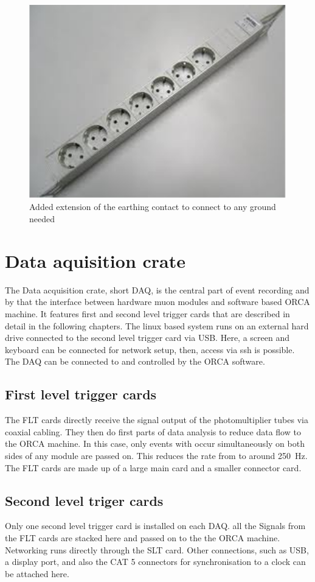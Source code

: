   \begin{figure}
  \centering
  \label{fig:multiplug}
  	\includegraphics[width = 0.4 \textwidth]{graphics/setup/multiplug.pdf}
  	\caption{Added extension of the earthing contact to connect to any ground needed}
  	
  \end{figure}



\section{Data aquisition crate}
\label{ch:DAQ}
The Data acquisition crate, short DAQ, is the central part of event recording and by that the interface between hardware muon modules and software based ORCA machine. It features first and second level trigger cards that are described in detail in the following chapters. The linux based system runs on an external hard drive connected to the second level trigger card via USB. Here, a screen and keyboard can be connected for network setup, then, access via ssh is possible. The DAQ can be connected to and controlled by the ORCA software.
  \subsection{First level trigger cards}
  \label{ch:DAQ:sec:FLTs}
  The FLT cards directly receive the signal output of the photomultiplier tubes via coaxial cabling. They then do first parts of data analysis to reduce data flow to the ORCA machine. In this case, only events with occur simultaneously on both sides of any module are passed on. This reduces the rate from  to around \SI{250}{\hertz}. The FLT cards are made up of a large main card and a smaller connector card. 
  \subsection{Second level triger cards}
  \label{ch:DAQ:sec:SLTs}
  Only one second level trigger card is installed on each DAQ. all the Signals from the FLT cards are stacked here and passed on to the the ORCA machine. Networking runs directly through the SLT card. Other connections, such as USB, a display port, and also the CAT 5 connectors for synchronisation to a clock can be attached here.

